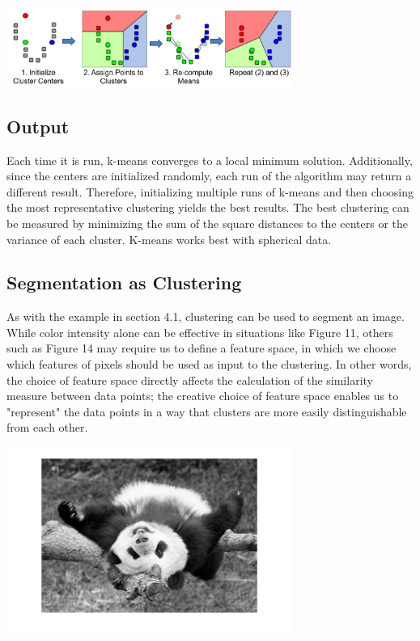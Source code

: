 \documentclass{article}
\begin{document}
\begin{minipage}{\linewidth}
\begin{center}
\includegraphics[width=0.70\textwidth]{k-means-algorithm.png}
\end{center}
\end{minipage}

\subsection{Output}
Each time it is run, k-means converges to a local minimum solution. Additionally, since the centers are initialized randomly, each run of the algorithm may return a different result. Therefore, initializing multiple runs of k-means and then choosing the most representative clustering yields the best results. The best clustering can be measured by minimizing the sum of the square distances to the centers or the variance of each cluster. K-means works best with spherical data.

\subsection{Segmentation as Clustering}
As with the example in section 4.1, clustering can be used to segment an image. While color intensity alone can be effective in situations like Figure 11, others such as Figure 14 may require us to define a feature space, in which we choose which features of pixels should be used as input to the clustering. In other words, the choice of feature space directly affects the calculation of the similarity measure between data points; the creative choice of feature space enables us to "represent" the data points in a way that clusters are more easily distinguishable from each other.

\begin{minipage}{\linewidth}
\begin{center}
\includegraphics[width=0.70\textwidth]{panda.jpg}
\end{center}
\end{minipage}
\end{document}
